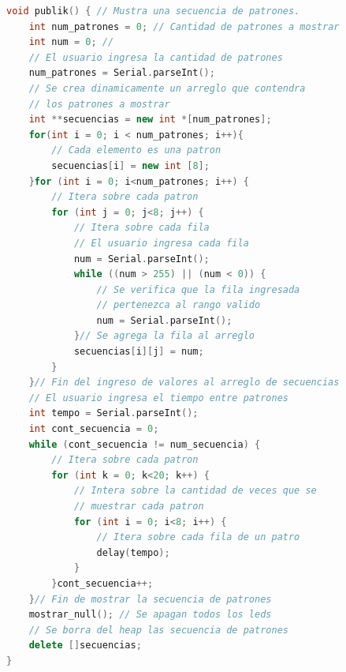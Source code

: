 \documentclass{article}
\begin{document}
\begin{lstlisting}[language=C++, label=codigo_ejemplo]
void publik() { // Mustra una secuencia de patrones. 
    int num_patrones = 0; // Cantidad de patrones a mostrar
    int num = 0; // 
    // El usuario ingresa la cantidad de patrones
    num_patrones = Serial.parseInt();
    // Se crea dinamicamente un arreglo que contendra 
    // los patrones a mostrar
    int **secuencias = new int *[num_patrones];
    for(int i = 0; i < num_patrones; i++){
        // Cada elemento es una patron
        secuencias[i] = new int [8];
    }for (int i = 0; i<num_patrones; i++) {
        // Itera sobre cada patron
        for (int j = 0; j<8; j++) {
            // Itera sobre cada fila
            // El usuario ingresa cada fila 
            num = Serial.parseInt();
            while ((num > 255) || (num < 0)) {
                // Se verifica que la fila ingresada 
                // pertenezca al rango valido
                num = Serial.parseInt();
            }// Se agrega la fila al arreglo
            secuencias[i][j] = num;
        }
    }// Fin del ingreso de valores al arreglo de secuencias
    // El usuario ingresa el tiempo entre patrones
    int tempo = Serial.parseInt();
    int cont_secuencia = 0;
    while (cont_secuencia != num_secuencia) {
        // Itera sobre cada patron
        for (int k = 0; k<20; k++) {
            // Intera sobre la cantidad de veces que se 
            // muestrar cada patron 
            for (int i = 0; i<8; i++) {
                // Itera sobre cada fila de un patro
                delay(tempo);
            }
        }cont_secuencia++;
    }// Fin de mostrar la secuencia de patrones
    mostrar_null(); // Se apagan todos los leds
    // Se borra del heap las secuencia de patrones 
    delete []secuencias;
}


\end{lstlisting}
\end{document}
